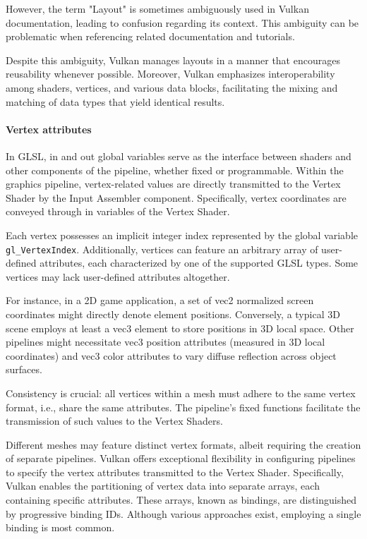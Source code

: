 However, the term "Layout" is sometimes ambiguously used in Vulkan documentation, leading to confusion regarding its context. 
This ambiguity can be problematic when referencing related documentation and tutorials.

Despite this ambiguity, Vulkan manages layouts in a manner that encourages reusability whenever possible. 
Moreover, Vulkan emphasizes interoperability among shaders, vertices, and various data blocks, facilitating the mixing and matching of data types that yield identical results.

\paragraph*{Vertex attributes}
In GLSL, in and out global variables serve as the interface between shaders and other components of the pipeline, whether fixed or programmable.
Within the graphics pipeline, vertex-related values are directly transmitted to the Vertex Shader by the Input Assembler component. 
Specifically, vertex coordinates are conveyed through in variables of the Vertex Shader.

Each vertex possesses an implicit integer index represented by the global variable \\\texttt{gl\_VertexIndex}. 
Additionally, vertices can feature an arbitrary array of user-defined attributes, each characterized by one of the supported GLSL types. 
Some vertices may lack user-defined attributes altogether.

For instance, in a 2D game application, a set of vec2 normalized screen coordinates might directly denote element positions. 
Conversely, a typical 3D scene employs at least a vec3 element to store positions in 3D local space. 
Other pipelines might necessitate vec3 position attributes (measured in 3D local coordinates) and vec3 color attributes to vary diffuse reflection across object surfaces.

Consistency is crucial: all vertices within a mesh must adhere to the same vertex format, i.e., share the same attributes. 
The pipeline's fixed functions facilitate the transmission of such values to the Vertex Shaders.

Different meshes may feature distinct vertex formats, albeit requiring the creation of separate pipelines. 
Vulkan offers exceptional flexibility in configuring pipelines to specify the vertex attributes transmitted to the Vertex Shader.
Specifically, Vulkan enables the partitioning of vertex data into separate arrays, each containing specific attributes. 
These arrays, known as bindings, are distinguished by progressive binding IDs. 
Although various approaches exist, employing a single binding is most common.

